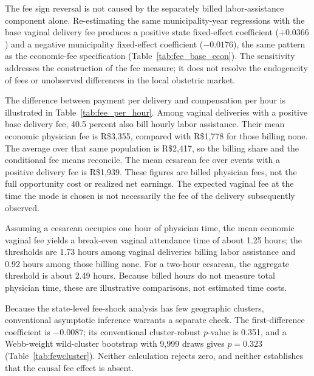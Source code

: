 
\FloatBarrier

The fee sign reversal is not caused by the separately billed labor-assistance
component alone. Re-estimating the same municipality-year regressions with the base
vaginal delivery fee produces a positive state fixed-effect coefficient ($+0.0366$)
and a negative municipality fixed-effect coefficient ($-0.0176$), the same pattern
as the economic-fee specification (Table~\ref{tab:fee_base_econ}). The sensitivity
addresses the construction of the fee measure; it does not resolve the endogeneity
of fees or unobserved differences in the local obstetric market.



The difference between payment per delivery and compensation per hour is
illustrated in Table~\ref{tab:fee_per_hour}. Among vaginal deliveries with a
positive base delivery fee, 40.5 percent also bill hourly labor assistance. Their
mean economic physician fee is R\$3,355, compared with R\$1,778 for those billing
none. The average over that same population is R\$2,417, so the billing share and
the conditional fee means reconcile. The mean cesarean fee over events with a
positive delivery fee is R\$1,939. These figures are billed physician fees, not the
full opportunity cost or realized net earnings. The expected vaginal fee at the
time the mode is chosen is not necessarily the fee of the delivery subsequently
observed.

Assuming a cesarean occupies one hour of physician time, the mean economic vaginal
fee yields a break-even vaginal attendance time of about 1.25 hours; the thresholds
are 1.73 hours among vaginal deliveries billing labor assistance and 0.92 hours
among those billing none. For a two-hour cesarean, the aggregate threshold is about
2.49 hours. Because billed hours do not measure total physician time, these are
illustrative comparisons, not estimated time costs.



Because the state-level fee-shock analysis has few geographic clusters,
conventional asymptotic inference warrants a separate check. The first-difference
coefficient is $-0.0087$; its conventional cluster-robust $p$-value is 0.351, and a
Webb-weight wild-cluster bootstrap with 9,999 draws \citep{cameron2008,webb2023}
gives $p = 0.323$ (Table~\ref{tab:fewcluster}). Neither calculation rejects zero,
and neither establishes that the causal fee effect is absent.

